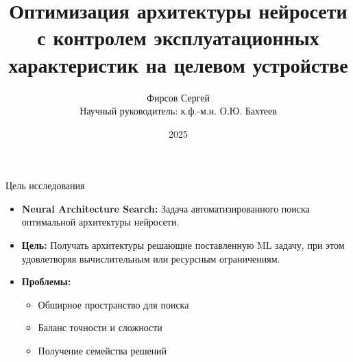\documentclass{beamer}
\title{Оптимизация архитектуры нейросети с контролем эксплуатационных характеристик на целевом устройстве}
\author{Фирсов Сергей \\ \vspace{5pt} Научный руководитель: к.ф.-м.н. О.Ю. Бахтеев}
\institute{Московский физико-технический институт}
\date{2025}
\begin{document}
\begin{frame}[plain]
    \titlepage
\end{frame} %


\begin{frame}{Цель исследования}

\begin{itemize}

    \item \textbf{Neural Architecture Search:} 
    Задача автоматизированного поиска оптимальной архитектуры нейросети. 

    \vspace{10pt}
    
    \item \textbf{Цель:} 
    Получать архитектуры решающие поставленную ML задачу, при этом удовлетворяя вычислительным или ресурсным ограничениям.
    
    \vspace{10pt}

    
    \item \textbf{Проблемы:} %
    \begin{itemize}
        \footnotesize
        \item {Обширное пространство для поиска}
        \item {Баланс точности и сложности}
        \item {Получение семейства решений}
    \end{itemize}
    \end{itemize}
 
\end{frame}
\end{document}
